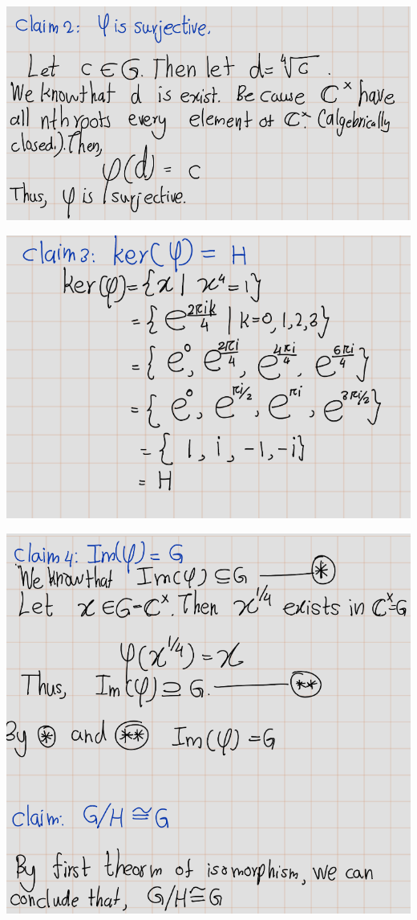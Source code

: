 \documentclass[
]{book}
\begin{document}
\includegraphics{figures/ch_2/fig37.png}

\includegraphics{figures/ch_2/fig38.png}

\includegraphics{figures/ch_2/fig39.png}
\end{document}

